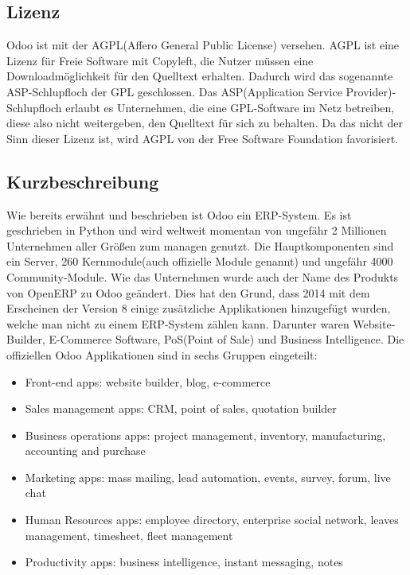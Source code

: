 \subsection{Lizenz}
Odoo ist mit der AGPL(Affero General Public License) versehen. AGPL ist eine Lizenz für Freie Software mit Copyleft, die Nutzer müssen eine Downloadmöglichkeit für den Quelltext erhalten. Dadurch wird das sogenannte ASP-Schlupfloch der GPL geschlossen. Das ASP(Application Service Provider)-Schlupfloch erlaubt es Unternehmen, die eine GPL-Software im Netz betreiben, diese also nicht weitergeben, den Quelltext für sich zu behalten. Da das nicht der Sinn dieser Lizenz ist, wird AGPL von der Free Software Foundation favorisiert.


\subsection{Kurzbeschreibung}
Wie bereits erwähnt und beschrieben ist Odoo ein ERP-System. Es ist geschrieben in Python und wird weltweit momentan von ungefähr 2 Millionen Unternehmen aller Größen zum managen genutzt.
Die Hauptkomponenten sind ein Server, 260 Kernmodule(auch offizielle Module genannt) und ungefähr 4000 Community-Module.
Wie das Unternehmen wurde auch der Name des Produkts von OpenERP zu Odoo geändert. Dies hat den Grund, dass 2014 mit dem Erscheinen der Version 8 einige zusätzliche Applikationen hinzugefügt wurden, welche man nicht zu einem ERP-System zählen kann. Darunter waren Website-Builder, E-Commerce Software, PoS(Point of Sale) und Business Intelligence.
Die offiziellen Odoo Applikationen sind in sechs Gruppen eingeteilt:

\begin{itemize}
	\item Front-end apps: website builder, blog, e-commerce
	\item Sales management apps: CRM, point of sales, quotation builder
	\item Business operations apps: project management, inventory, manufacturing, accounting and purchase
	\item Marketing apps: mass mailing, lead automation, events, survey, forum, live chat
	\item Human Resources apps: employee directory, enterprise social network, leaves management, timesheet, fleet management
	\item Productivity apps: business intelligence, instant messaging, notes
\end{itemize}

